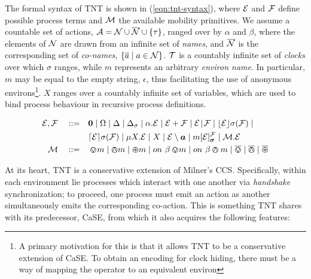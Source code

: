 \documentclass[orivec,envcountsame]{llncs}
\begin{document}
The formal syntax of TNT is shown in (\ref{eqn:tnt-syntax}), where
$\text{$\mathcal{E}$}$ and $\text{$\mathcal{F}$}$ define possible process terms and $\text{$\mathcal{M}$}$ the
available mobility primitives. We assume a countable set of actions,
$\text{$\mathcal{A}$} = \text{$\mathcal{N}$} \cup \text{$\overline{\text{$\mathcal{N}$}}$} \cup \{\tau\}$, ranged over by $\alpha$
and $\beta$, where the elements of $\text{$\mathcal{N}$}$ are drawn from an infinite
set of \emph{names}, and $\text{$\overline{\text{$\mathcal{N}$}}$}$ is the corresponding set of
\emph{co-names}, $\{\overline{a} \mid a \in \text{$\mathcal{N}$}\}$. $\text{$\mathcal{T}$}$ is a
countably infinite set of \emph{clocks} over which $\sigma$ ranges,
while $m$ represents an arbitrary \emph{environ name}. In particular,
$m$ may be equal to the empty string, $\epsilon$, thus facilitating the
use of anonymous environs\footnote{A primary motivation for this is that
it allows TNT to be a conservative extension of CaSE. To obtain an
encoding for clock hiding, there must be a way of mapping the operator
to an equivalent environ}. $X$ ranges over a countably infinite set of
variables, which are used to bind process behaviour in recursive process
definitions.

\begin{equation}
  \begin{aligned}
    \expr, \exprb \quad \mathrel{::=} \quad &
      \nil  \mid
      \Omega \mid
      \Delta \mid
      \Delta_{\sigma} \mid
      \alpha . \expr  \mid
      \expr + \exprb \mid
      \expr \mathrel{\!|\!} \exprb \mid
      \timeout{\expr}{\sigma}{\exprb} \mid \\
    & \stimeout{\expr}{\sigma}{\exprb} \mid 
      \mu X . \expr \mid
      X \mid 
      \expr \setminus \vec{a} \mid
      \locv{m}{\expr}{\exprb}{\vec{\sigma}} \mid
      \ambop . \expr \\
   \ambop \quad \mathrel{::=} \quad & \tntin{m} \mid \tntout{m} \mid \tntopen{m} \mid
      \procin{\beta}{m} \mid \procout{\beta}{m} \mid \bin \mid
      \bout \mid \bopen
   \end{aligned}
   \label{eqn:tnt-syntax}
\end{equation}


At its heart, TNT is a conservative extension of Milner's CCS.
Specifically, within each environment lie processes which interact with
one another via \emph{handshake} synchronization; to proceed, one
process must emit an action as another simultaneously emits the
corresponding co-action.  This is something TNT shares with its
predecessor, CaSE, from which it also acquires the following features:
\end{document}
